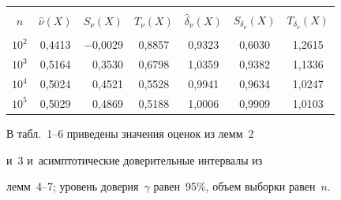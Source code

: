 \begin{table}[b]
\begin{center}




\vspace*{2ex}





\tabcolsep=12pt


\begin{tabular}{|c|c|r|c|c|c|c|}


\hline


&&&&&&\\[-9pt]


 $n$ & ${\hat \nu}(X)$& \multicolumn{1}{c|}{$S_\nu(X)$}& $T_\nu(X)$& ${\hat \delta}_\nu(X)$& 


$S_{\delta_\nu}(X)$& $T_{\delta_\nu}(X)$\\[2pt]


\hline


&&&&&&\\[-9pt]


$10^2$& 0{,}4413& $-$0{,}0029& 0{,}8857& 0{,}9323& 0{,}6030& 1{,}2615\\


$10^3$& 0{,}5164& 0{,}3530& 0{,}6798& 1{,}0359& 0{,}9382& 1{,}1336\\


$10^4$& 0{,}5024& 0{,}4521& 0{,}5528& 0{,}9941& 0{,}9634& 1{,}0247\\


$10^5$& 0{,}5029& 0{,}4869& 0{,}5188& 1{,}0006& 0{,}9909& 1{,}0103\\


\hline


\end{tabular}


\end{center}


\end{table}





В табл.~1--6 приведены значения оценок из лемм~2 


и~3 и~асимп\-то\-ти\-че\-ские доверительные интервалы из 


лемм~4--7; уровень доверия~$\gamma$ равен~95\%, объ\-ем вы\-бор\-ки равен~$n$.





